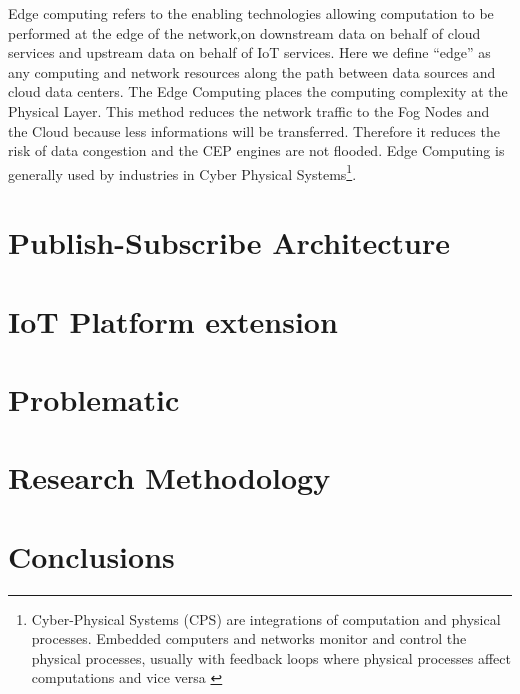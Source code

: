 \documentclass[11pt]{article}
\begin{document}
Edge computing refers to the enabling technologies allowing computation to be performed at the edge of the network,on downstream data on behalf of cloud services and upstream data on behalf of IoT services. Here we define “edge” as any computing and network resources along the path between data sources and cloud data centers.\cite{Edge Computing - Vision and Challenges}
\newline\newline
The Edge Computing places the computing complexity at the Physical Layer. This method reduces the network traffic to the Fog Nodes and the Cloud because less informations will be transferred. Therefore it reduces the risk of data congestion and the CEP engines are not flooded. Edge Computing is generally used by industries in Cyber Physical Systems\footnote{Cyber-Physical Systems (CPS) are integrations of computation and physical processes. Embedded computers and networks monitor and control the physical processes, usually with feedback loops where physical processes affect computations and vice versa \cite{5}}.


\section{Publish-Subscribe Architecture}


\section{IoT Platform extension}



\section{Problematic}


\section{Research Methodology}


\section{Conclusions}


\newpage
\listoffigures
\nocite{*}
\printbibliography
\end{document}

